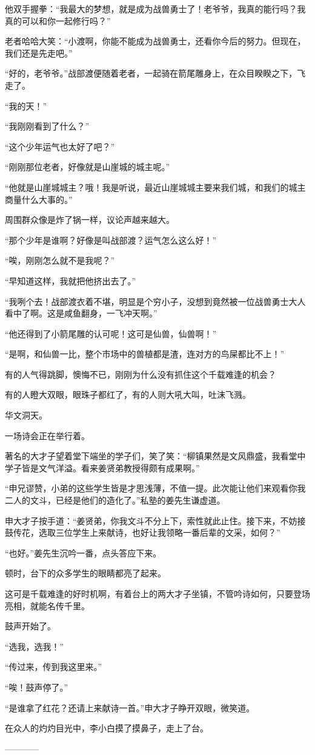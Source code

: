 \begin{this_body}
他双手握拳：“我最大的梦想，就是成为战兽勇士了！老爷爷，我真的能行吗？我真的可以和你一起修行吗？”

老者哈哈大笑：“小渡啊，你能不能成为战兽勇士，还看你今后的努力。但现在，我们还是先走吧。”

“好的，老爷爷。”战部渡便随着老者，一起骑在箭尾雕身上，在众目睽睽之下，飞走了。

“我的天！”

“我刚刚看到了什么？”

“这个少年运气也太好了吧？”

“刚刚那位老者，好像就是山崖城的城主呢。”

“他就是山崖城城主？哦！我是听说，最近山崖城城主要来我们城，和我们的城主商量什么大事的。”

周围群众像是炸了锅一样，议论声越来越大。

“那个少年是谁啊？好像是叫战部渡？运气怎么这么好！”

“唉，刚刚怎么就不是我呢？”

“早知道这样，我就把他挤出去了。”

“我咧个去！战部渡衣着不堪，明显是个穷小子，没想到竟然被一位战兽勇士大人看中了啊。这是咸鱼翻身，一飞冲天啊。”

“他还得到了小箭尾雕的认可呢！这可是仙兽，仙兽啊！”

“是啊，和仙兽一比，整个市场中的兽植都是渣，连对方的鸟屎都比不上！”

有的人气得跳脚，懊悔不已，刚刚为什么没有抓住这个千载难逢的机会？

有的人瞪大双眼，眼珠子都红了，有的人则大吼大叫，吐沫飞溅。

华文洞天。

一场诗会正在举行着。

著名的大才子望着堂下端坐的学子们，笑了笑：“柳镇果然是文风鼎盛，我看堂中学子皆是文气洋溢。看来姜贤弟教授得颇有成果啊。”

“申兄谬赞，小弟的这些学生皆是才思浅薄，不值一提。此次能让他们来观看你我二人的文斗，已经是他们的造化了。”私塾的姜先生谦虚道。

申大才子按手道：“姜贤弟，你我文斗不分上下，索性就此止住。接下来，不妨接鼓传花，选取三位学生上来献诗，也好让我领略一番后辈的文采，如何？”

“也好。”姜先生沉吟一番，点头答应下来。

顿时，台下的众多学生的眼睛都亮了起来。

这可是千载难逢的好时机啊，有着台上的两大才子坐镇，不管吟诗如何，只要登场亮相，就能名传千里。

鼓声开始了。

“选我，选我！”

“传过来，传到我这里来。”

“唉！鼓声停了。”

“是谁拿了红花？还请上来献诗一首。”申大才子睁开双眼，微笑道。

在众人的灼灼目光中，李小白摸了摸鼻子，走上了台。

------------

\end{this_body}

